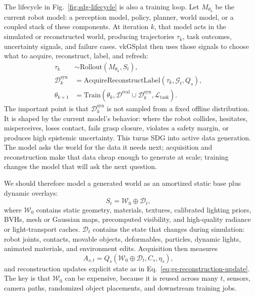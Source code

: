 \documentclass[10pt,journal,onecolumn]{IEEEtran}
\begin{document}
The lifecycle in Fig.~\ref{fig:sdg-lifecycle} is also a training loop. Let
$M_{\theta_k}$ be the current robot model: a perception model, policy, planner,
world model, or a coupled stack of these components. At iteration $k$, that
model acts in the simulated or reconstructed world, producing trajectories
$\tau_k$, task outcomes, uncertainty signals, and failure cases. vkGSplat then
uses those signals to choose what to acquire, reconstruct, label, and refresh:
\begin{equation}
\boxed{
\begin{aligned}
  \tau_k
    &\sim \mathrm{Rollout}(M_{\theta_k}, S_t),\\
  \mathcal{D}^{\mathrm{syn}}_k
    &= \mathrm{AcquireReconstructLabel}(\tau_k, \mathcal{G}_t, Q_s),\\
  \theta_{k+1}
    &= \mathrm{Train}\!\left(\theta_k,
       \mathcal{D}^{\mathrm{real}} \cup \mathcal{D}^{\mathrm{syn}}_k,
       \mathcal{L}_{\mathrm{task}}\right).
\end{aligned}}
\label{eq:closed-loop-sdg-training}
\end{equation}
The important point is that $\mathcal{D}^{\mathrm{syn}}_k$ is not sampled from a
fixed offline distribution. It is shaped by the current model's behavior: where
the robot collides, hesitates, misperceives, loses contact, fails grasp
closure, violates a safety margin, or produces high epistemic uncertainty. This
turns SDG into active data generation. The model asks the world for the data it
needs next; acquisition and reconstruction make that data cheap enough to
generate at scale; training changes the model that will ask the next question.

We should therefore model a generated world as an amortized static base plus
dynamic overlays:
\begin{equation}
  S_t = \mathcal{W}_0 \oplus \mathcal{D}_t,
  \label{eq:world-plus-dynamics}
\end{equation}
where $\mathcal{W}_0$ contains static geometry, materials, textures, calibrated
lighting priors, BVHs, mesh or Gaussian maps, precomputed visibility, and
high-quality radiance or light-transport caches. $\mathcal{D}_t$ contains the
state that changes during simulation: robot joints, contacts, movable objects,
deformables, particles, dynamic lights, animated materials, and environment
edits. Acquisition then measures
\begin{equation}
  A_{s,t} = Q_s(\mathcal{W}_0 \oplus \mathcal{D}_t, C_s, \eta_s),
  \label{eq:world-lifecycle-acquisition}
\end{equation}
and reconstruction updates explicit state as in
Eq.~\ref{eq:gs-reconstruction-update}. The key is that $\mathcal{W}_0$ can be
expensive, because it is reused across many $t$, sensors, camera paths,
randomized object placements, and downstream training jobs.
\end{document}
